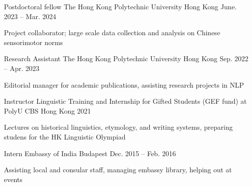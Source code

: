 
\begin{cventries}

  \cventry
    {Postdoctoral fellow} %
    {The Hong Kong Polytechnic University} %
    {Hong Kong} %
    {June. 2023 -- Mar. 2024} %
    {
      \begin{cvitems} %
        \item {Project collaborator; large scale data collection and analysis on Chinese sensorimotor norms}
      \end{cvitems}
    }
   
  \cventry
    {Research Assistant} %
    {The Hong Kong Polytechnic University} %
    {Hong Kong} %
    {Sep. 2022 -- Apr. 2023} %
    {
      \begin{cvitems} %
        \item {Editorial manager for academic publications, assisting research projects in NLP}
      \end{cvitems}
    }  

  \cventry
    {Instructor} %
    {Linguistic Training and Internship for Gifted Students (GEF fund) at PolyU CBS} %
    {Hong Kong} %
    {2021} %
    {
      \begin{cvitems} %
        \item {Lectures on historical linguistics, etymology, and writing systems, preparing studens for the HK Linguistic Olympiad}
      \end{cvitems}
    }

  \cventry
    {Intern} %
    {Embassy of India} %
    {Budapest} %
    {Dec. 2015 -- Feb. 2016} %
    {
      \begin{cvitems} %
        \item {Assisting local and consular staff, managing embassy library, helping out at events}
      \end{cvitems}
    }

\end{cventries}
